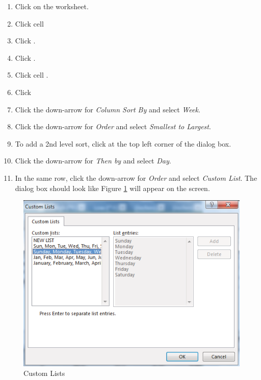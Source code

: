 \begin{enumerate}
	\item Click on the  worksheet.
	\item Click cell 
	\item Click .
	\item Click .
	\item Click cell .
	\item Click 	
	\item Click the down-arrow for \textit{Column Sort By} and select \textit{Week}.
	\item Click the down-arrow for \textit{Order} and select \textit{Smallest to Largest}.
	\item To add a 2nd level sort, click  at the top left corner of the dialog box.
	\item Click the down-arrow for \textit{Then by} and select \textit{Day}.
	\item In the same row, click the down-arrow for \textit{Order} and select \textit{Custom List}. The dialog box should look like Figure \ref{05:fig13} will appear on the screen.
\end{enumerate}

\begin{figure}[H]
	\centering
	\includegraphics[width=\maxwidth{.95\linewidth}]{gfx/ch05_fig13}
	\caption{Custom Lists}
	\label{05:fig13}
\end{figure}

